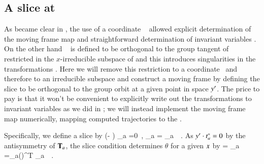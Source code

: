 
\subsection{\label{s:mfReqb}A slice at \reqv}

As became clear in , the use of a coordinate \slice\  
allowed explicit determination of the moving frame map  and straightforward 
determination of invariant variables . 
On the other hand \slice\  is defined to be orthogonal
to the group tangent of  restricted in the $x$-irreducible subspace of  
and this introduces singularities in the transformations .
Here we will remove this restriction to a coordinate \slice\ and therefore to 
an irreducible subspace and construct a moving frame by defining the slice to be orthogonal 
to the group orbit at a given point in space ${y'}$. The price to pay is that it 
won't be convenient to explicitly write out the transformations to invariant variables
as we did in ; we will instead implement the moving frame map numerically,
mapping computed trajectories to the \slice.

Specifically, we define a slice by
\beq
(\sspRed - \slicep ) \cdot \sliceTan_a =0
    \,,\qquad
\sliceTan_a  = \Lg_a \, \slicep
\,.
As ${y'}  \cdot t^*_a =0$ by the antisymmetry of
$\mathbf{T}_a$, the slice condition  determines
$\theta$ for a given $x$ by
 = \sspRed \cdot \Lg_a \, \slicep
	=\ssp \cdot \LieElrep_a(\theta)^T \Lg_a \, \slicep
\,.

